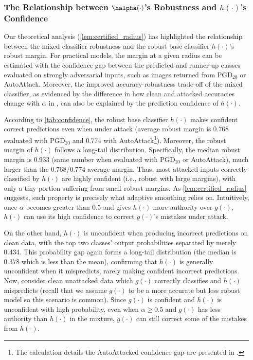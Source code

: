 \documentclass[11pt, letterpaper]{article}
\theoremstyle{plain}
\theoremstyle{definition}
\begin{document}
\subsubsection{The Relationship between $\halpha (\cdot)$'s Robustness and $h (\cdot)$'s Confidence} \label{sec:conf_properties}


Our theoretical analysis (\cref{lem:certified_radius}) has highlighted the relationship between the mixed classifier robustness and the robust base classifier $h (\cdot)$'s robust margin. For practical models, the margin at a given radius can be estimated with the confidence gap between the predicted and runner-up classes evaluated on strongly adversarial inputs, such as images returned from PGD$_{20}$ or AutoAttack. Moreover, the improved accuracy-robustness trade-off of the mixed classifier, as evidenced by the difference in how clean and attacked accuracies change with $\alpha$ in , can also be explained by the prediction confidence of $h (\cdot)$.

According to \cref{tab:confidence}, the robust base classifier $h (\cdot)$ makes confident correct predictions even when under attack (average robust margin is 0.768 evaluated with PGD$_{20}$ and 0.774 with AutoAttack\footnote{The calculation details the AutoAttacked confidence gap are presented in .}). Moreover, the robust margin of $h (\cdot)$ follows a long-tail distribution. Specifically, the median robust margin is $0.933$ (same number when evaluated with PGD$_{20}$ or AutoAttack), much larger than the $0.768/0.774$ average margin. Thus, most attacked inputs correctly classified by $h (\cdot)$ are highly confident (i.e., robust with large margins), with only a tiny portion suffering from small robust margins. As \cref{lem:certified_radius} suggests, such property is precisely what adaptive smoothing relies on. Intuitively, once $\alpha$ becomes greater than $0.5$ and gives $h (\cdot)$ more authority over $g (\cdot)$, $h (\cdot)$ can use its high confidence to correct $g (\cdot)$'s mistakes under attack.

On the other hand, $h (\cdot)$ is unconfident when producing incorrect predictions on clean data, with the top two classes' output probabilities separated by merely 0.434. This probability gap again forms a long-tail distribution (the median is 0.378 which is less than the mean), confirming that $h (\cdot)$ is generally unconfident when it mispredicts, rarely making confident incorrect predictions. Now, consider clean unattacked data which $g (\cdot)$ correctly classifies and $h (\cdot)$ mispredicts (recall that we assume $g (\cdot)$ to be a more accurate but less robust model so this scenario is common). Since $g (\cdot)$ is confident and $h (\cdot)$ is unconfident with high probability, even when $\alpha \geq 0.5$ and $g (\cdot)$ has less authority than $h (\cdot)$ in the mixture, $g (\cdot)$ can still correct some of the mistakes from $h (\cdot)$.
\end{document}
